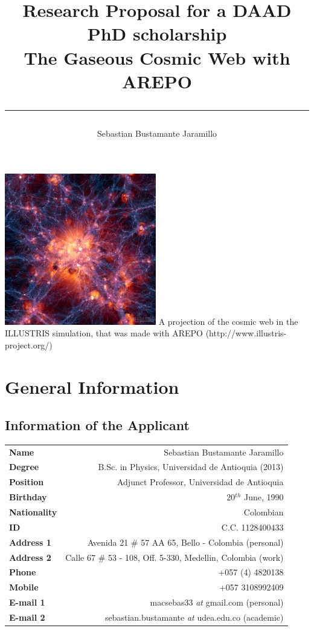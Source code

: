 \documentclass[a4,useAMS,usenatbib,usegraphicx,12pt]{article}
\title{{\textbf{Research Proposal for a DAAD PhD scholarship}}\\ The Gaseous Cosmic Web with AREPO\\ \color{black}\rule{15cm}{0.5mm}}
\author{Sebastian Bustamante Jaramillo}
\date{}
\begin{document}
\maketitle
\begin{center}
\includegraphics[trim = 0mm 3.5cm 0mm 3.0cm, clip, keepaspectratio=true,
width=0.7\textheight]{Presentation1.png}
\tiny{A projection of the cosmic web in the ILLUSTRIS simulation, that was made 
with AREPO (http://www.illustris-project.org/)}
\end{center}
\tableofcontents
 
\newpage 

\section{General Information}
\small
\subsection*{Information of the Applicant}
\begin{tabular}{L!{\VRule}R}
\bf Name		& Sebastian Bustamante Jaramillo\\
\bf Degree		& B.Sc. in Physics, Universidad de Antioquia (2013)\\
\bf Position	& Adjunct Professor, Universidad de Antioquia\\
\bf Birthday	& { 20$^{th}$ June, 1990}\\
\bf Nationality & Colombian\\
\bf ID			& C.C. 1128400433\\
\bf Address 1	& Avenida 21 \# 57 AA 65, Bello - Colombia (personal)\\
\bf Address 2	& Calle 67 \# 53 - 108, Off. 5-330, Medellin, Colombia (work)\\
\bf Phone		& +057 (4) 4820138\\
\bf Mobile		& +057 3108992409\\
\bf E-mail 1	& macsebas33 \textit{at} gmail.com (personal)\\
\bf E-mail 2	& sebastian.bustamante \textit{at} udea.edu.co (academic)\\
\end{tabular}
\end{document}
